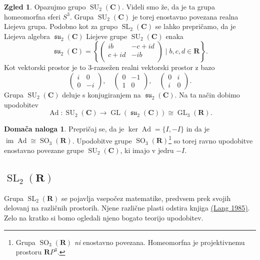 \documentclass[11pt]{book}
\def\RR{\mathbf{R}}
\def\CC{\mathbf{C}}
\DeclareMathOperator\image{im}
\DeclareMathOperator\SU{SU}
\DeclareMathOperator\GL{GL}
\DeclareMathOperator\sufrak{\mathfrak{su}}
\DeclareMathOperator\SL{SL}
\DeclareMathOperator\SO{SO}
\DeclareMathOperator\Ad{Ad}
\theoremstyle{definition}
\theoremstyle{zgled}
\newtheorem{zgled}[theorem]{Zgled}
\theoremstyle{zgledbrezstevilke}
\theoremstyle{odprtproblem}
\theoremstyle{domacanaloga}
\newtheorem{domacanaloga}[theorem]{Domača naloga}
\theoremstyle{izrek}
\begin{document}
\begin{zgled}
Opazujmo grupo $\SU_2(\CC)$. Videli smo že, da je ta grupa homeomorfna sferi $S^3$. Grupa $\SU_2(\CC)$ je torej enostavno povezana realna Liejeva grupa. Podobno kot za grupo $\SL_2(\CC)$ se lahko prepričamo, da je Liejeva algebra $\sufrak_2(\CC)$ Liejeve grupe $\SU_2(\CC)$ enaka
    \[
        {\textstyle \sufrak_2(\CC)} = \left\{ \begin{pmatrix} i b & -c + i d \\ c + i d & - i b \\  \end{pmatrix} \mid b,c,d \in \RR \right\}.
    \]
Kot vektorski prostor je to $3$-razsežen realni vektorski prostor z bazo
\[
    \begin{pmatrix}
        i & 0 \\ 0 & -i
    \end{pmatrix}, \quad
    \begin{pmatrix}
        0 & -1 \\
        1 & 0
    \end{pmatrix}, \quad
    \begin{pmatrix}
        0 & i \\ i & 0
    \end{pmatrix}.
\]
Grupa $\SU_2(\CC)$ deluje s konjugiranjem na $\sufrak_2(\CC)$. Na ta način dobimo upodobitev
\[
    \textstyle \Ad \colon \SU_2(\CC) \to \GL(\sufrak_2(\CC)) \cong \GL_3(\RR).
\]

\begin{domacanaloga}
    Prepričaj se, da je $\ker \Ad = \{ I, -I \}$ in da je $\image \Ad \cong \SO_3(\RR)$. Upodobitve grupe $\SO_3(\RR)$\footnote{Grupa $\SO_3(\RR)$ \emph{ni} enostavno povezana. Homeomorfna je projektivnemu prostoru $\RR P^3$.} so torej ravno upodobitve enostavno povezane grupe $\SU_2(\CC)$, ki imajo v jedru $-I$.
\end{domacanaloga}

\end{zgled}

\subsection{$\SL_2(\RR)$}

Grupa $\SL_2(\RR)$ se pojavlja vsepočez matematike, predvsem prek svojih delovanj na različnih prostorih. Njene različne plasti odstira knjiga \href{https://link.springer.com/book/10.1007/978-1-4612-5142-2}{(Lang 1985)}. Zelo na kratko si bomo ogledali njeno bogato teorijo upodobitev.
\end{document}
